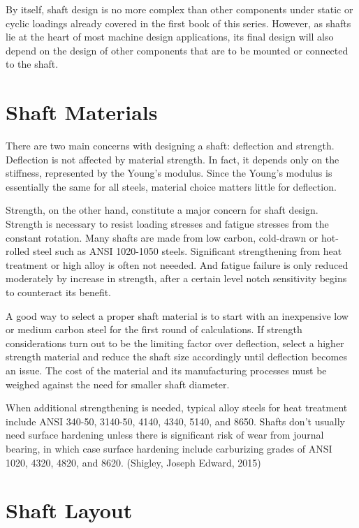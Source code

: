 \documentclass[a4paper,openany,svgnames]{kaobook}
\begin{document}
By itself, shaft design is no more complex than other components under static or cyclic loadings already covered in the first book of this series. However, as shafts lie at the heart of most machine design applications, its final design will also depend on the design of other components that are to be mounted or connected to the shaft.

\section{Shaft Materials}
\label{sec:org357394e}

There are two main concerns with designing a shaft: deflection and strength. Deflection is not affected by material strength. In fact, it depends only on the stiffness, represented by the Young's modulus. Since the Young's modulus is essentially the same for all steels, material choice matters little for deflection.

Strength, on the other hand, constitute a major concern for shaft design. Strength is necessary to resist loading stresses and fatigue stresses from the constant rotation. Many shafts are made from low carbon, cold-drawn or hot-rolled steel such as ANSI 1020-1050 steels. Significant strengthening from heat treatment or high alloy is often not neeeded. And fatigue failure is only reduced moderately by increase in strength, after a certain level notch sensitivity begins to counteract its benefit.

A good way to select a proper shaft material is to start with an inexpensive low or medium carbon steel for the first round of calculations. If strength considerations turn out to be the limiting factor over deflection, select a higher strength material and reduce the shaft size accordingly until deflection becomes an issue. The cost of the material and its manufacturing processes must be weighed against the need for smaller shaft diameter.

When additional strengthening is needed, typical alloy steels for heat treatment include ANSI 340-50, 3140-50, 4140, 4340, 5140, and 8650. Shafts don't usually need surface hardening unless there is significant risk of wear from journal bearing, in which case surface hardening include carburizing grades of ANSI 1020, 4320, 4820, and 8620. (Shigley, Joseph Edward, 2015)

\section{Shaft Layout}
\label{sec:org0971754}
\end{document}
